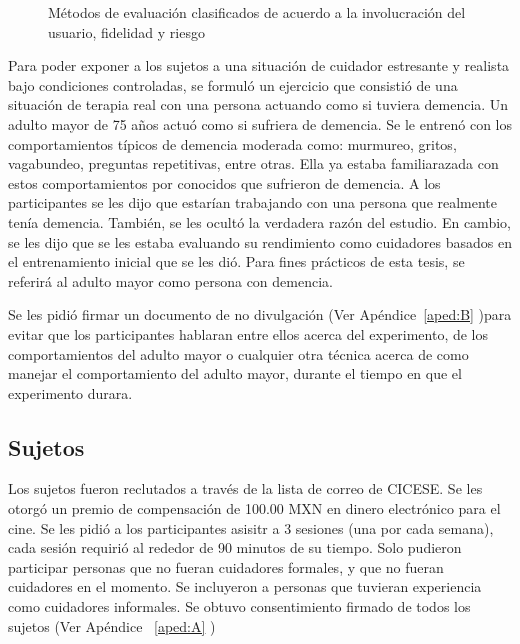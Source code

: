 \begin{figure}[h]
        \centering
        \caption{M\'etodos de evaluaci\'on clasificados de acuerdo a la involucraci\'on del usuario, fidelidad y riesgo}\label{fig:evalmethods}
\end{figure}


Para poder exponer a los sujetos a una situaci\'on de cuidador estresante y realista bajo condiciones controladas, se formul\'o un ejercicio que consisti\'o de una situaci\'on de terapia real con una persona actuando como si tuviera demencia. Un adulto mayor de 75 a\~nos actu\'o como si sufriera de demencia. Se le entren\'o con los comportamientos t\'ipicos de demencia moderada como: murmureo, gritos, vagabundeo, preguntas repetitivas, entre otras. Ella ya estaba familiarazada con estos comportamientos por conocidos que sufrieron de demencia. A los participantes se les dijo que estar\'ian trabajando con una persona que realmente ten\'ia demencia. Tambi\'en, se les ocult\'o la verdadera raz\'on del estudio. En cambio, se les dijo que se les estaba evaluando su rendimiento como cuidadores basados en el entrenamiento inicial que se les di\'o. Para fines pr\'acticos de esta tesis, se referir\'a al adulto mayor como persona con demencia.

Se les pidi\'o firmar un documento de no divulgaci\'on (Ver Ap\'endice~\ref{aped:B} )para evitar que los participantes hablaran entre ellos acerca del experimento, de los comportamientos del adulto mayor o cualquier otra t\'ecnica acerca de como manejar el comportamiento del adulto mayor, durante el tiempo en que el experimento durara.

\subsection{Sujetos}\label{secc:subjects}
Los sujetos fueron reclutados a trav\'es de la lista de correo de CICESE. Se les otorg\'o un premio de compensaci\'on de 100.00 MXN en dinero electr\'onico para el cine. Se les pidi\'o a los participantes asisitr a 3 sesiones (una por cada semana), cada sesi\'on requiri\'o al rededor de 90 minutos de su tiempo. Solo pudieron participar personas que no fueran cuidadores formales, y que no fueran cuidadores en el momento. Se incluyeron a personas que tuvieran experiencia como cuidadores informales. Se obtuvo consentimiento firmado de todos los sujetos (Ver Ap\'endice ~\ref{aped:A} )

